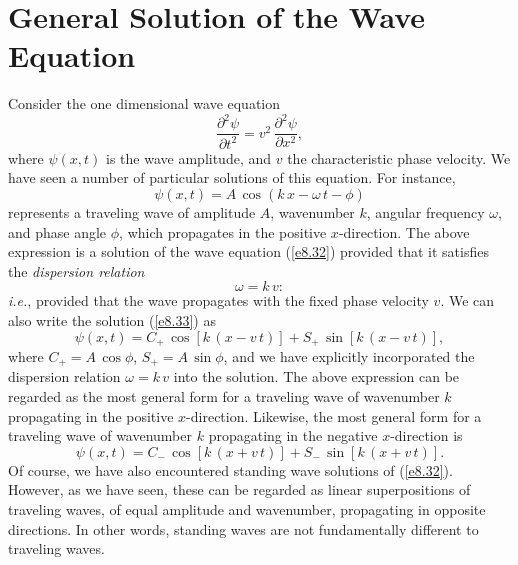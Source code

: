 \section{General Solution of the Wave Equation}
Consider the one dimensional wave equation
\begin{equation}\label{e8.32}
\frac{\partial^2\psi}{\partial t^2} = v^2\,\frac{\partial^2\psi}{\partial x^2},
\end{equation}
where $\psi(x,t)$ is the wave amplitude, and $v$ the characteristic phase velocity. We have seen a number of
particular solutions of this equation. For instance,
\begin{equation}\label{e8.33}
\psi(x,t) = A\,\cos(k\,x-\omega\,t-\phi)
\end{equation}
represents a traveling wave of amplitude $A$, wavenumber $k$, angular frequency $\omega$, and phase angle $\phi$, which propagates in the positive $x$-direction. 
The above expression is a solution of the wave equation  (\ref{e8.32}) provided 
that it satisfies the {\em dispersion relation}
\begin{equation}
\omega = k\,v:
\end{equation}
{\em i.e.}, provided that the wave propagates with the fixed phase velocity $v$. 
We can also write the solution (\ref{e8.33}) as
\begin{equation}
\psi(x,t) = C_+\,\cos[k\,(x-v\,t)] + S_+\,\sin[k\,(x-v\,t)],
\end{equation}
where $C_+=A\,\cos\phi$, $S_+=A\,\sin\phi$, and we have explicitly incorporated the dispersion relation 
$\omega=k\,v$ into the solution. The above expression can be regarded as the most general
form for a traveling wave of wavenumber $k$ propagating in the positive $x$-direction.
Likewise, the most general form for a traveling wave of wavenumber $k$ propagating
in the negative $x$-direction is
\begin{equation}
\psi(x,t) = C_-\,\cos[k\,(x+v\,t)] + S_-\,\sin[k\,(x+v\,t)].
\end{equation}
Of course, we have also encountered standing wave solutions of (\ref{e8.32}). 
However, as we have seen, these can  be regarded as linear superpositions of traveling waves,  of equal
amplitude and wavenumber, propagating in opposite directions. 
In other words, standing waves are not fundamentally different to traveling waves.

